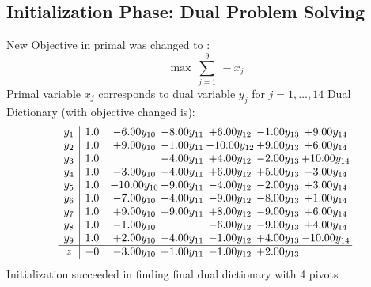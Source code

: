 \documentclass[9pt]{article}
\begin{document}
\subsection{Initialization Phase: Dual Problem Solving}
New Objective in primal was changed to : \[ \max\ \sum_{j=1}^{9}\ - x_j \] 
Primal variable $x_j$ corresponds to dual variable $y_j$ for $j = 1,\ldots,14$
Dual Dictionary (with objective changed is): 
\[\begin{array}{c| c c@{\hskip 2pt} c@{\hskip 2pt} c@{\hskip 2pt} c@{\hskip 2pt} c@{\hskip 2pt} }
 y_{1}   &  1.0 & -6.00 y_{10} & -8.00 y_{11} & +  6.00 y_{12} & -1.00 y_{13} & +  9.00 y_{14}\\
 y_{2}   &  1.0 & +  9.00 y_{10} & -1.00 y_{11} & -10.00 y_{12} & +  9.00 y_{13} & +  6.00 y_{14}\\
 y_{3}   &  1.0  &   & -4.00 y_{11} & +  4.00 y_{12} & -2.00 y_{13} & + 10.00 y_{14}\\
 y_{4}   &  1.0 & -3.00 y_{10} & -4.00 y_{11} & +  6.00 y_{12} & +  5.00 y_{13} & -3.00 y_{14}\\
 y_{5}   &  1.0 & -10.00 y_{10} & +  9.00 y_{11} & -4.00 y_{12} & -2.00 y_{13} & +  3.00 y_{14}\\
 y_{6}   &  1.0 & -7.00 y_{10} & +  4.00 y_{11} & -9.00 y_{12} & -8.00 y_{13} & +  1.00 y_{14}\\
 y_{7}   &  1.0 & +  9.00 y_{10} & +  9.00 y_{11} & +  8.00 y_{12} & -9.00 y_{13} & +  6.00 y_{14}\\
 y_{8}   &  1.0 & -1.00 y_{10} &   & -6.00 y_{12} & -9.00 y_{13} & +  4.00 y_{14}\\
 y_{9}   &  1.0 & +  2.00 y_{10} & -4.00 y_{11} & -1.00 y_{12} & +  4.00 y_{13} & -10.00 y_{14}\\
\hline
z    &  -0 & -3.00 y_{10} & +  1.00 y_{11} & -1.00 y_{12} & +  2.00 y_{13} &   \\
\end{array}\]
Initialization succeeded in finding final dual dictionary with 4 pivots
\end{document}
